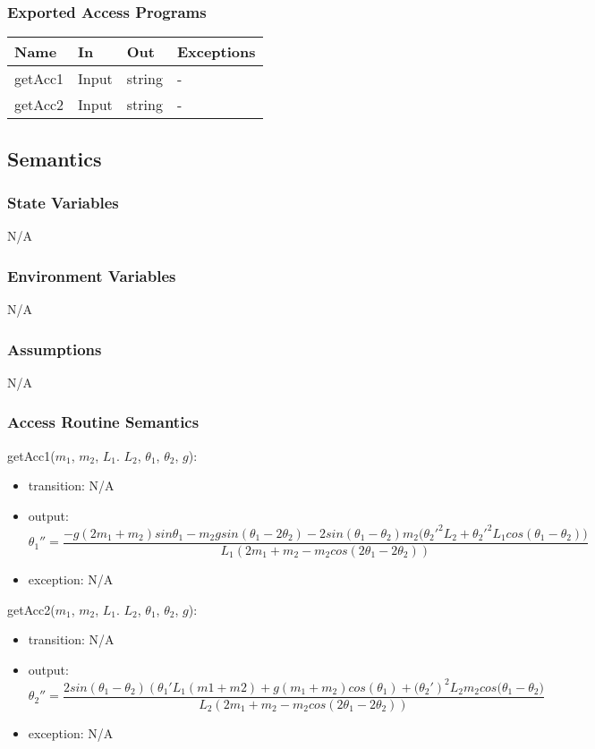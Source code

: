 \documentclass[12pt, titlepage]{article}
\begin{document}
\subsubsection{Exported Access Programs}

\begin{center}
\begin{tabular}{p{4cm} p{2cm} p{2cm} p{4cm}}
\hline
\textbf{Name} & \textbf{In} & \textbf{Out} & \textbf{Exceptions} \\
\hline
getAcc1 & Input & string & - \\
\hline
getAcc2 & Input & string & - \\
\hline
\end{tabular}
\end{center}

\subsection{Semantics}

\subsubsection{State Variables}
N/A
\subsubsection{Environment Variables}
N/A
\subsubsection{Assumptions}
N/A
\subsubsection{Access Routine Semantics}

\noindent getAcc1($m_1$, $m_2$, $L_1$. $L_2$, $\theta_1$, $\theta_2$, $g$):
\begin{itemize}
\item transition: N/A 
\item output: 
\[{\theta_1}''=\frac{-g(2m_1+m_2)sin\theta_1-m_2gsin(\theta_1-2\theta_2)-2sin(\theta_1-\theta_2)m_2({{\theta_2}'}^2L_2+{{\theta_2}'}^2L_1cos(\theta_1-\theta_2)\big)}{L_1(2m_1+m_2-m_2cos(2\theta_1-2\theta_2))}\]
\item exception: N/A
\end{itemize}

\noindent getAcc2($m_1$, $m_2$, $L_1$. $L_2$, $\theta_1$, $\theta_2$, $g$):
\begin{itemize}
\item transition: N/A 
\item output: 
\[{\theta_2}''=\frac{2sin(\theta_1-\theta_2)({\theta_1}'L_1(m1+m2)+g(m_1+m_2)cos(\theta_1)+{(\theta_2}')^2L_2m_2cos(\theta_1-\theta_2\big)}{L_2(2m_1+m_2-m_2cos(2\theta_1-2\theta_2))}\]
\item exception: N/A
\end{itemize}
\end{document}
